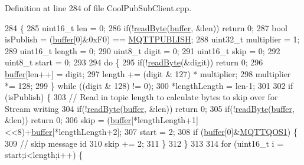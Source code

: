 Definition at line 284 of file Cool\+Pub\+Sub\+Client.\+cpp.


\begin{DoxyCode}
284                                                            \{
285     uint16\_t len = 0;
286     \textcolor{keywordflow}{if}(!\hyperlink{class_cool_pub_sub_client_ad409bbd287d5894f0cf082f62446c002}{readByte}(\hyperlink{class_cool_pub_sub_client_a7e8bcc6096626916046a51bebadc7851}{buffer}, &len)) \textcolor{keywordflow}{return} 0;
287     \textcolor{keywordtype}{bool} isPublish = (\hyperlink{class_cool_pub_sub_client_a7e8bcc6096626916046a51bebadc7851}{buffer}[0]&0xF0) == \hyperlink{_cool_pub_sub_client_8h_a673aa9dd952b13bf964449d67d21db85}{MQTTPUBLISH};
288     uint32\_t multiplier = 1;
289     uint16\_t length = 0;
290     uint8\_t digit = 0;
291     uint16\_t skip = 0;
292     uint8\_t start = 0;
293 
294     \textcolor{keywordflow}{do} \{
295         \textcolor{keywordflow}{if}(!\hyperlink{class_cool_pub_sub_client_ad409bbd287d5894f0cf082f62446c002}{readByte}(&digit)) \textcolor{keywordflow}{return} 0;
296         \hyperlink{class_cool_pub_sub_client_a7e8bcc6096626916046a51bebadc7851}{buffer}[len++] = digit;
297         length += (digit & 127) * multiplier;
298         multiplier *= 128;
299     \} \textcolor{keywordflow}{while} ((digit & 128) != 0);
300     *lengthLength = len-1;
301 
302     \textcolor{keywordflow}{if} (isPublish) \{
303         \textcolor{comment}{// Read in topic length to calculate bytes to skip over for Stream writing}
304         \textcolor{keywordflow}{if}(!\hyperlink{class_cool_pub_sub_client_ad409bbd287d5894f0cf082f62446c002}{readByte}(\hyperlink{class_cool_pub_sub_client_a7e8bcc6096626916046a51bebadc7851}{buffer}, &len)) \textcolor{keywordflow}{return} 0;
305         \textcolor{keywordflow}{if}(!\hyperlink{class_cool_pub_sub_client_ad409bbd287d5894f0cf082f62446c002}{readByte}(\hyperlink{class_cool_pub_sub_client_a7e8bcc6096626916046a51bebadc7851}{buffer}, &len)) \textcolor{keywordflow}{return} 0;
306         skip = (\hyperlink{class_cool_pub_sub_client_a7e8bcc6096626916046a51bebadc7851}{buffer}[*lengthLength+1]<<8)+\hyperlink{class_cool_pub_sub_client_a7e8bcc6096626916046a51bebadc7851}{buffer}[*lengthLength+2];
307         start = 2;
308         \textcolor{keywordflow}{if} (\hyperlink{class_cool_pub_sub_client_a7e8bcc6096626916046a51bebadc7851}{buffer}[0]&\hyperlink{_cool_pub_sub_client_8h_a2365b1c4755e7dc1136c3f02488d1d41}{MQTTQOS1}) \{
309             \textcolor{comment}{// skip message id}
310             skip += 2;
311         \}
312     \}
313 
314     \textcolor{keywordflow}{for} (uint16\_t i = start;i<length;i++) \{

\end{DoxyCode}
